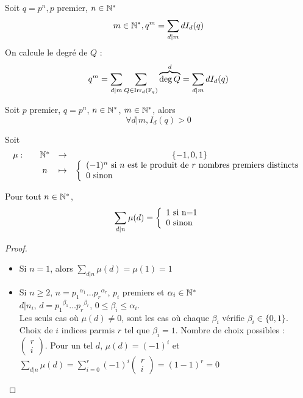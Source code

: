 \documentclass[]{report}
\begin{document}
    \begin{cor}{}{}
        Soit $q=p^n,p$ premier, $n\in\mathbb{N}^*$\\
        \[m\in\mathbb{N}^*,q^m=\sum_{d|m}dI_d(q)\]
        On calcule le degré de $Q$ :
        \[q^m=\sum_{d|m}\sum_{Q\in\text{Irr}_d(\mathbb{F}_q)}\overset{d}{\overbrace{\deg Q}}=\sum_{d|m}d I_d(q)\]
    \end{cor}

    \begin{prop}{}{}
        Soit $p$ premier, $q=p^n$, $n\in\mathbb{N}^*$, $m\in\mathbb{N}^*$, alors
        \[\forall d|m,I_d(q)>0\]
    \end{prop}

    \begin{df}{}{}
        Soit
        \[\begin{array}{ccccc} \mu : & & \mathbb{N}^* & \to & \{-1,0,1\} \\ & & n & \mapsto & \left\{\begin{array}{ll} (-1)^n\text{ si $n$ est le produit de $r$ nombres premiers distincts}\\0\text{ sinon} \end{array} \right. \end{array}\]
    \end{df}

    \begin{prop}{}{}
        Pour tout $n\in\mathbb{N}^*$,
        \[\sum_{d|n}\mu(d)=\left\{\begin{array}{ll} 1\text{ si n=1}\\0\text{ sinon} \end{array} \right.\]
    \end{prop}

    \begin{proof}
        \begin{itemize}
        \item Si $n=1$, alors $\displaystyle{\sum_{d|n}\mu(d)=\mu(1)=1}$
        \item Si $n\ge 2$, $n={p_1}^{\alpha_1}\ldots {p_r}^{\alpha_r}$, $p_i$ premiers et $\alpha_i\in\mathbb{N}^*$\\
        $d|n_i$, $d={p_1}^{\beta_1}\ldots{p_r}^{\beta_r}$, $0\le \beta_i \le \alpha_i$.\\
        Les seuls cas où $\mu(d)\neq 0$, sont les cas où chaque $\beta_i$ vérifie $\beta_i\in\{0,1\}$. Choix de $i$ indices parmis $r$ tel que $\beta_i=1$. Nombre de choix possibles : $\begin{pmatrix}
            r\\
            i
        \end{pmatrix}$. Pour un tel $d$, $\mu(d)=(-1)^i$ et $\displaystyle{\sum_{d|n}\mu(d)=\sum_{i=0}^r(-1)^i\begin{pmatrix}
            r\\
            i
        \end{pmatrix}=(1-1)^r=0}$
    \end{itemize}
    \end{proof}
\end{document}
